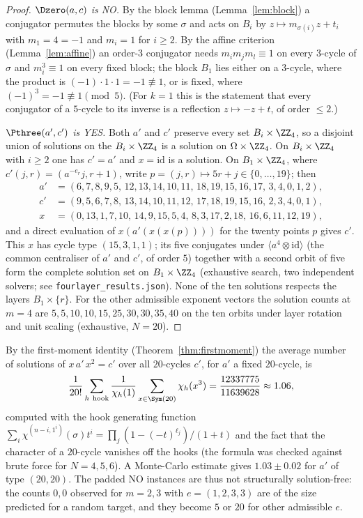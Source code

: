 \begin{proof}
\emph{$\Dzero(a,c)$ is NO.} By the block lemma (Lemma~\ref{lem:block}) a conjugator permutes the blocks by some $\sigma$ and acts on
$B_i$ by $z\mapsto m_{\sigma(i)}z+t_i$ with $m_1=4=-1$ and $m_i=1$ for $i\ge2$. By the affine criterion (Lemma~\ref{lem:affine}) an
order-$3$ conjugator needs $m_im_jm_l\equiv1$ on every $3$-cycle of $\sigma$ and $m_i^{3}\equiv1$ on every fixed block; the block $B_1$
lies either on a $3$-cycle, where the product is $(-1)\cdot1\cdot1=-1\not\equiv1$, or is fixed, where $(-1)^{3}=-1\not\equiv1\pmod5$.
(For $k=1$ this is the statement that every conjugator of a $5$-cycle to its inverse is a reflection $z\mapsto -z+t$, of order $\le2$.)

\emph{$\Pthree(a',c')$ is YES.} Both $a'$ and $c'$ preserve every set $B_i\times\ZZ_4$, so a disjoint union of solutions on the
$B_i\times\ZZ_4$ is a solution on $\Omega\times\ZZ_4$. On $B_i\times\ZZ_4$ with $i\ge2$ one has $c'=a'$ and $x=\mathrm{id}$ is a solution.
On $B_1\times\ZZ_4$, where $c'(j,r)=(a^{-e_r}j,r+1)$, write $p=(j,r)\mapsto 5r+j\in\{0,\dots,19\}$; then
\begin{align*}
a'&=(6,7,8,9,5,\,12,13,14,10,11,\,18,19,15,16,17,\,3,4,0,1,2),\\
c'&=(9,5,6,7,8,\,13,14,10,11,12,\,17,18,19,15,16,\,2,3,4,0,1),\\
x &=(0,13,1,7,10,\,14,9,15,5,4,\,8,3,17,2,18,\,16,6,11,12,19),
\end{align*}
and a direct evaluation of $x(a'(x(x(p))))$ for the twenty points $p$ gives $c'$. This $x$ has cycle type $(15,3,1,1)$; its five conjugates
under $\langle a^{4}\otimes\mathrm{id}\rangle$ (the common centraliser of $a'$ and $c'$, of order $5$) together with a second orbit of five form the complete
solution set on $B_1\times\ZZ_4$ (exhaustive search, two independent solvers; see \texttt{fourlayer\_results.json}). None of the ten
solutions respects the layers $B_1\times\{r\}$. For the other admissible exponent vectors the solution counts at $m=4$ are
$5,5,10,10,15,25,30,30,35,40$ on the ten orbits under layer rotation and unit scaling (exhaustive, $N=20$).
\end{proof}

\begin{rem}
By the first-moment identity (Theorem~\ref{thm:firstmoment}) the average number of solutions of $x\,a'\,x^{2}=c'$ over all $20$-cycles
$c'$, for $a'$ a fixed $20$-cycle, is
\[
\frac{1}{20!}\sum_{h\ \text{hook}}\frac{1}{\chi_h(1)}\sum_{x\in\Sym(20)}\chi_h(x^{3})=\frac{12337775}{11639628}\approx1.06,
\]
computed with the hook generating function $\sum_i\chi^{(n-i,1^i)}(\sigma)t^i=\prod_j(1-(-t)^{\ell_j})/(1+t)$ and the fact that the
character of a $20$-cycle vanishes off the hooks (the formula was checked against brute force for $N=4,5,6$). A Monte-Carlo estimate
gives $1.03\pm0.02$ for $a'$ of type $(20,20)$. The padded NO instances are thus not structurally solution-free: the counts $0,0$ observed
for $m=2,3$ with $e=(1,2,3,3)$ are of the size predicted for a random target, and they become $5$ or $20$ for other admissible $e$.
\end{rem}

